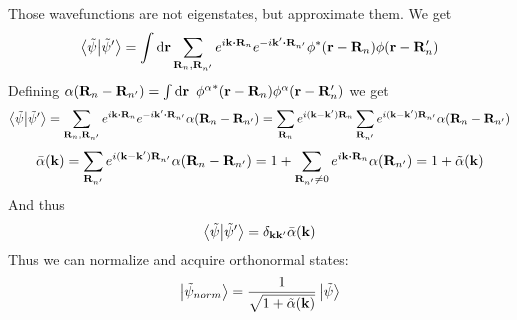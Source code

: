 Those wavefunctions are not eigenstates, but approximate them. We get
\begin{align}
\braket{\tilde{\psi}}{\tilde{\psi}'} = \int \dd{\vb{r}} \sum_{\vb{R}_n, \vb{R}_{n'}} e^{i \vb{k}\vdot \vb{R}_n}e^{-i \vb{k}'\vdot \vb{R}_{n'}}  {\phi}^* (\vb{r}-\vb{R}_n) \phi (\vb{r}-\vb{R}_n') 
	\end{align}
Defining $\alpha(\vb{R}_n - \vb{R}_{n'}) = \int \dd{\vb{r}} \ {\phi^\alpha}^* (\vb{r}-\vb{R}_n) \phi^\alpha (\vb{r}-\vb{R}_n') $ we get
\begin{align}
\braket{\tilde{\psi}}{\tilde{\psi}'} = \sum_{\vb{R}_n, \vb{R}_{n'} }  e^{i \vb{k}\vdot \vb{R}_n} e^{-i \vb{k}'\vdot \vb{R}_{n'}} \alpha(\vb{R}_n-\vb{R}_{n'}) = \sum_{\vb{R}_n} e^{i(\vb{k}-\vb{k}')\vb{R}_n}\sum_{\vb{R}_{n'}} e^{i(\vb{k}-\vb{k}')\vb{R}_{n'}} \alpha(\vb{R}_n-\vb{R}_{n'}) 
\end{align}
\begin{align}\bar{\alpha}(\vb{k}) = \sum_{\vb{R}_{n'}} e^{i(\vb{k}-\vb{k}')\vb{R}_{n'}} \alpha(\vb{R}_n-\vb{R}_{n'}) = 1 + \sum_{\vb{R}_{n'} \neq 0} e^{i\vb{k} \vdot \vb{R}_n} \alpha(\vb{R}_{n'}) = 1 + \tilde{\alpha}(\vb{k})\end{align}
And thus
\begin{align}\braket{\tilde{\psi}}{\tilde{\psi}'} = \delta_{\vb{k}\vb{k}'} \bar{\alpha}(\vb{k})\end{align}
Thus we can normalize and acquire orthonormal states:
\begin{align}\ket{\tilde{\psi}_{norm}} = \frac{1}{\sqrt{1+\tilde{\alpha}(\vb{k})}} \ket{\tilde{\psi}}\end{align}